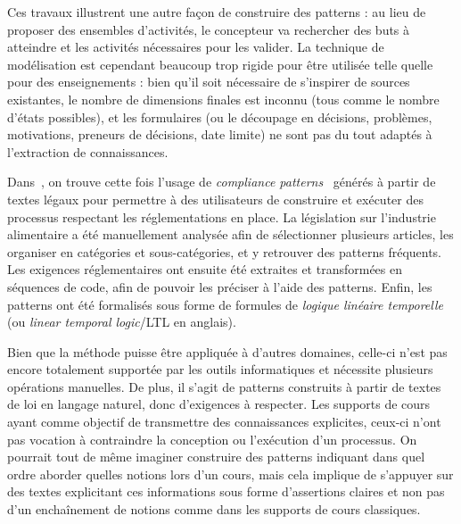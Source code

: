Ces travaux illustrent une autre façon de construire des patterns : au lieu de proposer des ensembles d'activités, le concepteur va rechercher des buts à atteindre et les activités nécessaires pour les valider.
La technique de modélisation est cependant beaucoup trop rigide pour être utilisée telle quelle pour des enseignements : bien qu'il soit nécessaire de s'inspirer de sources existantes, le nombre de dimensions finales est inconnu (tous comme le nombre d'états possibles), et les formulaires (ou le découpage en décisions, problèmes, motivations, preneurs de décisions, date limite) ne sont pas du tout adaptés à l'extraction de connaissances.

\bigskip

Dans~\cite{zasada2018box}, on trouve cette fois l'usage de \textit{compliance patterns}~\cite{elgammal2016formalizing} générés à partir de textes légaux pour permettre à des utilisateurs de construire et exécuter des processus respectant les réglementations en place.
La législation sur l'industrie alimentaire a été manuellement analysée afin de sélectionner plusieurs articles, les organiser en catégories et sous-catégories, et y retrouver des patterns fréquents.
Les exigences réglementaires ont ensuite été extraites et transformées en séquences de code, afin de pouvoir les préciser à l'aide des patterns.
Enfin, les patterns ont été formalisés sous forme de formules de \textit{logique linéaire temporelle} (ou \textit{linear temporal logic}/LTL en anglais).

Bien que la méthode puisse être appliquée à d'autres domaines, celle-ci n'est pas encore totalement supportée par les outils informatiques et nécessite plusieurs opérations manuelles.
De plus, il s'agit de patterns construits à partir de textes de loi en langage naturel, donc d'exigences à respecter.
Les supports de cours ayant comme objectif de transmettre des connaissances explicites, ceux-ci n'ont pas vocation à contraindre la conception ou l'exécution d'un processus.
On pourrait tout de même imaginer construire des patterns indiquant dans quel ordre aborder quelles notions lors d'un cours, mais cela implique de s'appuyer sur des textes explicitant ces informations sous forme d'assertions claires et non pas d'un enchaînement de notions comme dans les supports de cours classiques.

\bigskip

